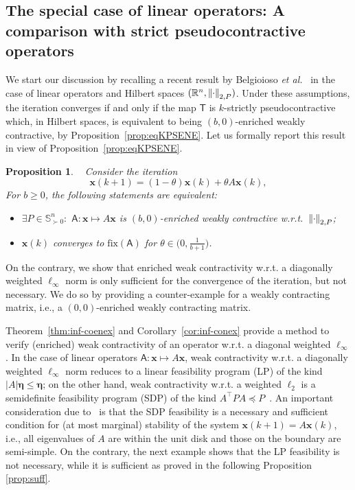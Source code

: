 \documentclass[journal,twoside,web]{ieeecolor}
\makeatletter
\newcommand{\abs}[1]{{\left\vert #1 \right\vert}}
\newcommand{\norm}[1]{{\left\vert\kern-0.25ex\left\vert #1\right\vert\kern-0.25ex\right\vert}}
\newcommand{\rea }{\mathbb{R}}
\newcommand{\xb}{\boldsymbol{x}}
\newcommand{\etab}{\boldsymbol{\eta}}
\newcommand{\Ts}{\mathsf{T}}
\newcommand{\As}{\mathsf{A}}
\newcommand{\fix}{\mathrm{fix}}
\newcommand{\diego}[1]{\color{red}{ @Diego: #1} \color{black}}
\newtheorem{prop}{Proposition}
\makeatother
\begin{document}

\subsection{The special case of linear operators: A comparison with strict pseudocontractive operators}
%
We start our discussion by recalling a recent result by Belgioioso \textit{et al.}~\cite{Belgioioso18} in the case of linear operators and Hilbert spaces $(\rea^n,\norm{\cdot}_{2,P})$.
%
Under these assumptions, the iteration converges if and only if the map $\Ts$ is $k$-strictly pseudocontractive which, in Hilbert spaces, is equivalent to being $(b,0)$-enriched weakly contractive, by Proposition~\ref{prop:eqKPSENE}.
%
Let us formally report this result in view of Proposition~\ref{prop:eqKPSENE}.
%
\begin{prop}\label{prop:belgio}
   ~\cite[Theorem 1]{Belgioioso18} Consider the iteration
    $$
    \xb(k+1) = (1-\theta)\xb(k)+\theta A\xb(k),
    $$
    For $b\geq 0$, the following statements are equivalent:
    \begin{itemize}
        \item $\exists P \in \mathbb{S}^n_{\succ 0}:$ $\As:\xb\mapsto A\xb$ is $(b,0)$-enriched weakly contractive w.r.t.~$\norm{\cdot}_{2,P}$;
        \item $\xb(k)$ converges to $\fix(\As)$ for ${\theta\in\big(0,\frac{1}{b+1}\big)}$.
    \end{itemize}

\end{prop}

On the contrary, we show that enriched weak contractivity w.r.t. a diagonally weighted $\ell_{\infty}$ norm is only sufficient for the convergence of the iteration, but not necessary. We do so by providing a counter-example for a weakly contracting matrix, i.e., a $(0,0)$-enriched weakly contracting matrix.

Theorem~\ref{thm:inf-coenex} and Corollary~\ref{cor:inf-conex} provide a method to verify (enriched) weak contractivity of an operator w.r.t. a diagonal weighted $\ell_{\infty}$.
%
In the case of linear operators ${\As:\xb\mapsto A\xb}$, weak contractivity w.r.t. a diagonally weighted $\ell_{\infty}$ norm reduces to a linear feasibility program (LP) of the kind ${\abs{A}\etab \leq \etab}$; 
%
on the other hand, weak contractivity w.r.t. a weighted $\ell_2$ is a semidefinite feasibility program (SDP) of the kind ${A^\top P A \preccurlyeq P}$~\cite[Lemma 3]{Belgioioso18}. 
%
An important consideration due to~\cite[Lemma 3]{Belgioioso18} is that the SDP feasibility is a necessary and sufficient condition for (at most marginal) stability of the system $\xb(k+1)=A\xb(k)$, i.e., all eigenvalues of $A$ are within the unit disk and those on the boundary are semi-simple. 
%
On the contrary, the next example shows that the LP feasibility is not necessary, while it is sufficient as proved in the following Proposition \ref{prop:suff}.
\end{document}
